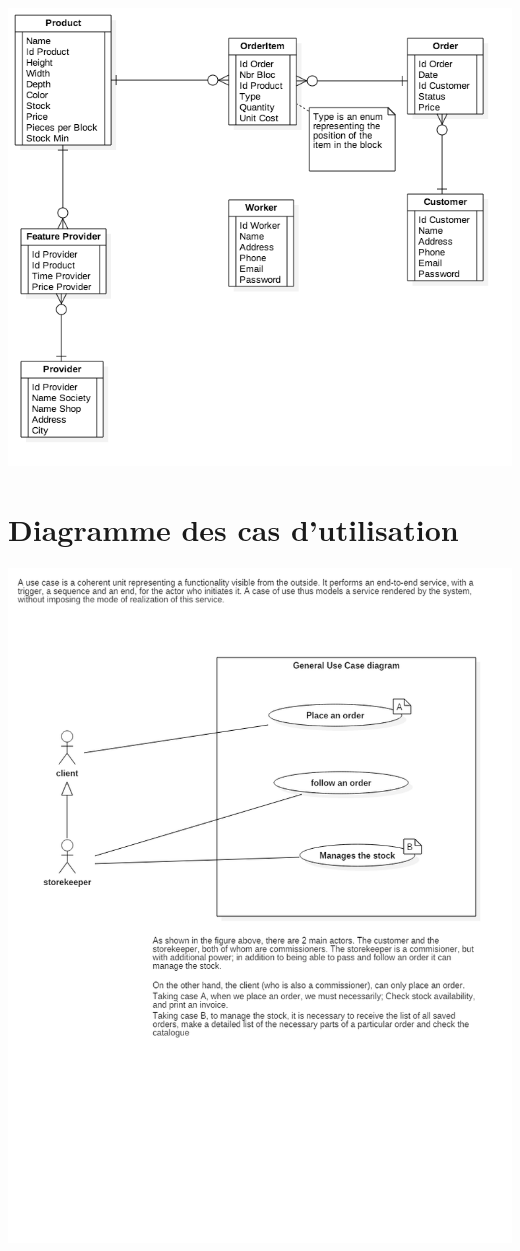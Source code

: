 \documentclass{ecam}
\begin{document}
\begin{center}

\includegraphics[angle=0,scale=0.3]{images/ERDDiagram.png}

\end{center}

\section{Diagramme des cas d'utilisation}
\begin{center}

\includegraphics[angle=0,scale=0.3]{images/use-case-diagram.png}
\end{center}
\end{document}

